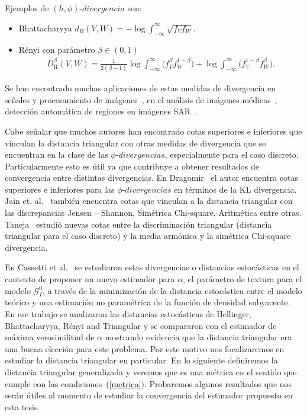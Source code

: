 \begin{example} Ejemplos de $\left(h,\phi\right) \text{-} divergencia$ son:
	\begin{itemize}
		\item Bhattacharyya $d_B(V,W)=-\log\int_{-\infty}^{\infty}\sqrt{f_Vf_W}.$
		
		\item R\'enyi con parámetro $\beta\in(0,1)$ 
		\begin{align}
		D_\text{R}^{\beta}(V,W)=\frac{1}{2(\beta-1)}\log\int_{-\infty}^{\infty}\big({f_V^{\beta}f_W^{1-\beta})+\log\int_{-\infty}^{\infty}\big(f_V^{1-\beta}f_W^{\beta}}\big).
		\end{align}
	\end{itemize}
\end{example}
		
Se han encontrado muchas aplicaciones de estas medidas de divergencia en señales y procesamiento de imágenes~\cite{4218961}, en el análisis de imágenes médicas~\cite{5599869}, detección automática de regiones en imágenes SAR~\cite{ClassificationPolSARSegmentsMinimizationWishartDistances,EdgeDetectionDistancesEntropiesJSTARS,SARSegmentationLevelSetGA0}. 

Cabe señalar que muchos autores han encontrado cotas superiores e inferiores que vinculan la distancia triangular con otras medidas de divergencia que se encuentran en la clase de las $\phi \text{-} divergencias$, especialmente para el caso discreto. Particularmente esto es útil ya que contribuye a obtener resultados de convergencia entre distintas divergencias. En Dragomir~\cite{Dragomir2002} el autor encuentra cotas superiores e inferiores para las $\phi \text{-} divergencias$ en términos de la KL divergencia. Jain et. al.~\cite{JainSrivastava2007} también encuentra cotas que vinculan a la distancia triangular con las discrepancias Jensen – Shannon, Simétrica Chi-square, Aritmética entre otras. Taneja~\cite{Taneja2006} estudió nuevas cotas entre la discriminación triangular (distancia triangular para el caso discreto) y la media armónica y la simétrica Chi-square divergencia.

En Cassetti et al.~\cite{APSAR2013ParameterEstimationStochasticDistances} se estudiaron estas divergencias o distancias estocásticas en el contexto de proponer un nuevo estimador para $\alpha$, el parámetro de textura para el modelo $\mathcal{G}_I^0$, a través de la minimización de la distancia estocástica entre el modelo teórico y una estimación no paramétrica de la función de densidad subyacente. En ese trabajo se analizaron las distancias estocásticas de Hellinger, Bhattacharyya, R\'enyi and Triangular y se compararon con el estimador de máxima verosimilitud de $\alpha$ mostrando evidencia que la distancia triangular era una buena elección para este problema. Por este motivo nos focalizaremos en estudiar la distancia triangular en particular. En lo siguiente definiremos la distancia triangular generalizada y veremos que es una métrica en el sentido que cumple con las condiciones~(\ref{metrica}). Probaremos algunos resultados que nos serán útiles al momento de estudiar la convergencia del estimador propuesto en esta tesis.


